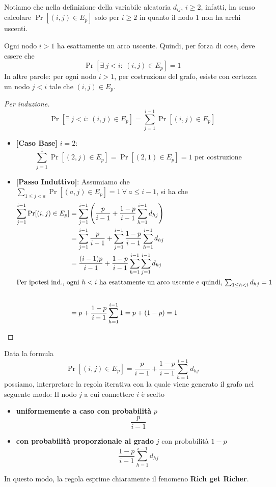 \begin{osservazione}
    Notiamo che nella definizione della variabile aleatoria $d_{ij}$, $i \geq 2$, infatti, ha senso calcolare $\Pr[(i,j)\in E_p]$ solo per $i \geq 2$ in quanto il nodo 1 non ha archi uscenti. 
\end{osservazione}

\begin{osservazione}
    Ogni nodo $i > 1$ ha esattamente un arco uscente. Quindi, per forza di cose, deve essere che
    \[
    \Pr[\exists\ j < i:\ (i,j) \in E_p] = 1
    \]
    In altre parole: per ogni nodo $i > 1$, per costruzione del grafo, esiste con certezza un nodo $j < i$ tale che $(i, j) \in E_p$.
\end{osservazione}

\begin{proof}[Per induzione]
    \[
    \Pr[\exists\ j < i:\ (i,j) \in E_p] = \sum_{j = 1}^{i-1} \Pr[(i,j) \in E_p]
    \]
    \begin{itemize}
        \item {\textbf{[Caso Base]} $i = 2$:
        \[
            \sum_{j = 1}^1 \Pr[(2,j) \in E_p] = \Pr[(2,1) \in E_p] = 1 \text{ per costruzione}
        \]
        }
        \item {\textbf{[Passo Induttivo]}: Assumiamo che $\sum_{1 \leq j<a} \Pr[(a,j) \in E_p ] = 1\ \forall\ a \leq i - 1$}, si ha che
        \begin{align*}  
        \sum_{j = 1}^{i - 1} \Pr[(i,j) \in E_p] &= \sum_{j = 1}^{i-1}\left( \frac{p}{i-1} + \frac{1-p}{i-1} \sum_{h=1}^{i-1} d_{hj} \right) \\
        &= \sum_{j = 1}^{i-1} \frac{p}{i-1} + \sum_{j=1}^{i-1} \frac{1-p}{i-1} \sum_{h=1}^{i-1} d_{hj} \\ 
        &= \frac{(i-1)p}{i-1} + \frac{1-p}{i-1} \sum_{h=1}^{i-1} \sum_{j=1}^{i-1} d_{hj} \\
        \intertext{Per ipotesi ind., ogni $h < i$ ha esattamente un arco uscente e quindi, $\sum_{1 \leq h < i} d_{hj} = 1$} \\
        &= p + \frac{1 - p}{i - 1} \sum_{h = 1}^{i-1} 1 = p + (1 - p) = 1
        \end{align*}
    \end{itemize}
\end{proof}

\begin{osservazione}
    Data la formula 
    \[
    \Pr[(i,j) \in E_p] = \frac{p}{i - 1} + \frac{1 - p}{i - 1} \sum_{h = 1}^{i-1} d_{hj}
    \]
    possiamo, interpretare la regola iterativa con la quale viene generato il grafo nel seguente modo: 
    Il nodo $j$ a cui connettere $i$ è scelto
\begin{itemize}
    \item \textbf{uniformemente a caso con probabilità} $p$
    \[
    \frac{p}{i-1}
    \]
    \item \textbf{con probabilità proporzionale al grado} $j$ con probabilità $1-p$
    \[
    \frac{1-p}{i-1}\sum_{h=1}^{i-1}d_{hj}
    \]
\end{itemize}
 In questo modo, la regola esprime chiaramente il fenomeno \textbf{Rich get Richer}.
\end{osservazione}


